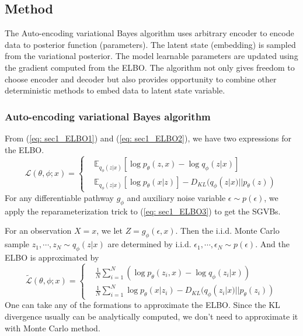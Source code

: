 \subsection{Method}

The Auto-encoding variational Bayes algorithm uses arbitrary encoder to encode data to posterior function (parameters).  
The latent state (embedding) is sampled from the variational posterior. 
The model learnable parameters are updated using the gradient computed from the ELBO. 
The algorithm not only gives freedom to choose encoder and decoder but also provides opportunity to combine other deterministic methods to embed data to latent state variable. 

\subsubsection{Auto-encoding variational Bayes algorithm}

From (\ref{eq: sec1_ELBO1}) and (\ref{eq: sec1_ELBO2}), we have two expressions for the ELBO. 
\begin{equation}
    \label{eq: sec1_ELBO3}
    \mathcal{L}(\theta,\phi;x) = \left\{
    \begin{aligned}
        & \mathbb{E}_{q_{\phi}(z|x)}[\log p_{\theta}(z,x) - \log q_{\phi}(z|x)] \\
        & \mathbb{E}_{q_{\phi}(z|x)}[\log p_{\theta}(x|z)] - D_{KL}(q_{\phi}(z|x)||p_{\theta}(z)) 
    \end{aligned}\right.
\end{equation}
For any differentiable pathway $g_{\phi}$ and auxiliary noise variable $\epsilon\sim p(\epsilon)$, 
we apply the reparameterization trick to (\ref{eq: sec1_ELBO3}) to get the SGVBs. 

For an observation $X=x$, we let $Z = g_{\phi}(\epsilon, x)$. 
Then the i.i.d. Monte Carlo sample $z_1,\cdots,z_N\sim q_{\phi}(z|x)$ are determined by i.i.d. $\epsilon_1,\cdots,\epsilon_N\sim p(\epsilon)$. 
And the ELBO is approximated by 
\begin{equation}
    \tilde{\mathcal{L}}(\theta,\phi;x) = \left\{
    \begin{aligned}
        & \frac{1}{N}\sum_{i=1}^{N}(\log p_{\theta}(z_i,x) - \log q_{\phi}(z_i|x)) \\
        & \frac{1}{N}\sum_{i=1}^{N}\log p_{\theta}(x|z_i) - D_{KL}(q_{\phi}(z_i|x)||p_{\theta}(z_i)) 
    \end{aligned}\right.
\end{equation}
One can take any of the formations to approximate the ELBO. 
Since the KL divergence usually can be analytically computed, we don't need to approximate it with Monte Carlo method. 

